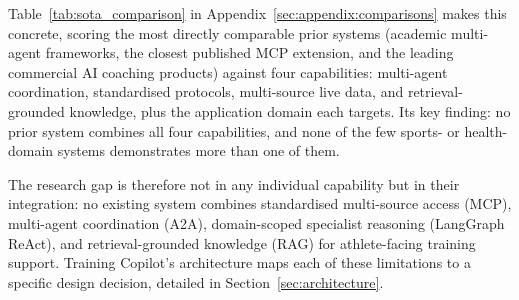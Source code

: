 Table~\ref{tab:sota_comparison} in Appendix~\ref{sec:appendix:comparisons} makes this concrete, scoring the most directly comparable prior systems (academic multi-agent frameworks, the closest published MCP extension, and the leading commercial AI coaching products) against four capabilities: multi-agent coordination, standardised protocols, multi-source live data, and retrieval-grounded knowledge, plus the application domain each targets. Its key finding: no prior system combines all four capabilities, and none of the few sports- or health-domain systems demonstrates more than one of them.

The research gap is therefore not in any individual capability but in their integration: no existing system combines standardised multi-source access (MCP), multi-agent coordination (A2A), domain-scoped specialist reasoning (LangGraph ReAct), and retrieval-grounded knowledge (RAG) for athlete-facing training support. Training Copilot's architecture maps each of these limitations to a specific design decision, detailed in Section~\ref{sec:architecture}.
